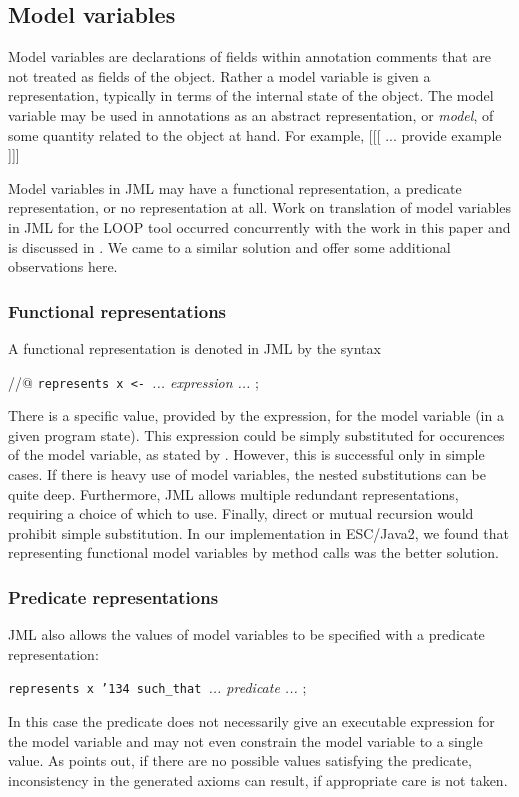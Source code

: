 \documentclass{sig-alternate}
\begin{document}
\subsection{Model variables}

Model variables are declarations of fields within annotation comments that are not treated
as fields of the object.  Rather a model variable is given a representation, typically in 
terms of the internal state of the object.  The model variable may be used in annotations
as an abstract representation, or {\em model}, of some quantity related to the object at hand.
For example, [[[ ... provide example ]]]

Model variables in JML may have a functional representation, a predicate representation, or 
no representation at all.  Work on translation of model variables in JML for the LOOP tool 
occurred concurrently with the work in this paper and is discussed in 
\cite{BreunessePoll03}.  We came to
a similar solution and offer some additional observations here.

\subsubsection {Functional representations}

A functional representation is denoted in JML by the syntax
\begin{center} //@ \texttt{represents x <- }{\em ... expression ... } ; \end{center}
There is a specific value, provided by the expression, for the model variable (in a given program 
state).   This expression could be simply substituted for occurences of the model variable, as
stated by \cite{BreunessePoll03}.  However, this is successful only in simple cases.  If there
is heavy use of model variables, the nested substitutions can be quite deep.  Furthermore,
JML allows multiple redundant representations, requiring a choice of which to use.  Finally,
direct or mutual recursion would prohibit simple substitution.  In our implementation in
ESC/Java2, we found that representing functional model variables by method
calls was the better
solution.

\subsubsection{Predicate representations}

JML also allows the values of model variables to be specified with a predicate representation:
\begin{center} \texttt{represents x \char'134 such\_that }{\em ... predicate ... } ; \end{center}
In this case the predicate does not necessarily give an executable expression for the
model variable and may not even constrain the model variable to a single value.  As
\cite{BreunessePoll03} points out, if there are no possible values satisfying the predicate, 
inconsistency in the generated axioms can result, if appropriate care is not taken.
\end{document}
